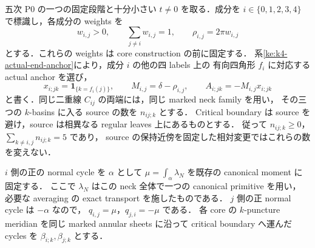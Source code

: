 \begin{proposition}
\label{ke:k4-actual-neck-periods}
五次 P0 の一つの固定段階と十分小さい $t\ne0$ を取る．成分を
$i\in\{0,1,2,3,4\}$ で標識し，各成分の weights を
\[
 w_{i,j}>0,\qquad \sum_{j\ne i}w_{i,j}=1,
 \qquad \rho_{i,j}=2\pi w_{i,j}
\]
とする．これらの weights は core construction の前に固定する．
系\ref{ke:k4-actual-end-anchor}により，成分 $i$ の他の四 labels 上の
有向四角形 $f_i$ に対応する actual anchor を選び，
\[
 x_{i;jk}=\mathbf1_{\{k=f_i(j)\}},\qquad
 M_{i,j}=\delta-\rho_{i,j},\qquad
 A_{i;jk}=-M_{i,j}x_{i;jk}
\]
と書く．同じ二重線 $C_{ij}$ の両端には，同じ marked neck family を用い，
その三つの $k$-basins に入る source の数を $n_{ij;k}$ とする．
Critical boundary は source を避け，source は相異なる regular leaves 上にあるものとする．
従って $n_{ij;k}\ge0$，$\sum_{k\ne i,j}n_{ij;k}=5$ であり，
source の保持近傍を固定した相対変更ではこれらの数を変えない．

$i$ 側の正の normal cycle を $\alpha$ として
$\mu=\int_\alpha\lambda_N$ を既存の canonical moment に固定する．
ここで $\lambda_N$ はこの neck 全体で一つの canonical primitive を用い，
必要な averaging の exact transport を施したものである．
$j$ 側の正 normal cycle は $-\alpha$ なので，
$q_{i,j}=\mu$，$q_{j,i}=-\mu$ である．
各 core の $k$-puncture meridian を同じ marked annular sheets に沿って
critical boundary へ運んだ cycles を $\beta_{i;k},\beta_{j;k}$ とする．


\end{proposition}
